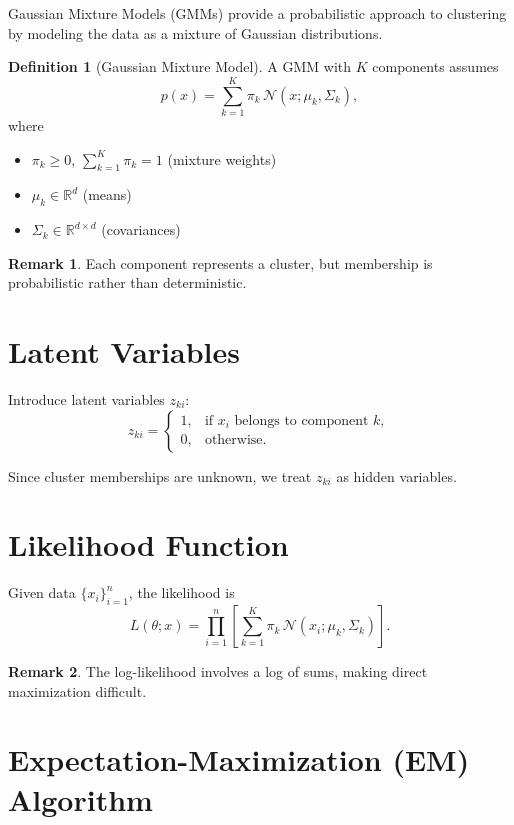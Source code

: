 \documentclass[12pt,oneside]{book}
\numberwithin{equation}{section}
\theoremstyle{definition}
\newtheorem{definition}{Definition}[section]
\newtheorem{remark}{Remark}[section]
\theoremstyle{plain}
\theoremstyle{remark}
\newcommand{\R}{\mathbb{R}}
\begin{document}
Gaussian Mixture Models (GMMs) provide a probabilistic approach to clustering by modeling the data as a mixture of Gaussian distributions.

\begin{definition}[Gaussian Mixture Model]
A GMM with $K$ components assumes
\[
p(x)
=
\sum_{k=1}^K \pi_k \, \mathcal{N}(x;\mu_k,\Sigma_k),
\]
where
\begin{itemize}
    \item $\pi_k \ge 0$, $\sum_{k=1}^K \pi_k = 1$ (mixture weights)
    \item $\mu_k \in \R^d$ (means)
    \item $\Sigma_k \in \R^{d\times d}$ (covariances)
\end{itemize}
\end{definition}

\begin{remark}
Each component represents a cluster, but membership is probabilistic rather than deterministic.
\end{remark}

\section{Latent Variables}

Introduce latent variables $z_{ki}$:
\[
z_{ki} =
\begin{cases}
1, & \text{if } x_i \text{ belongs to component } k,\\
0, & \text{otherwise}.
\end{cases}
\]

Since cluster memberships are unknown, we treat $z_{ki}$ as hidden variables.

\section{Likelihood Function}

Given data $\{x_i\}_{i=1}^n$, the likelihood is
\[
L(\theta; x)
=
\prod_{i=1}^n
\left[
\sum_{k=1}^K \pi_k \, \mathcal{N}(x_i;\mu_k,\Sigma_k)
\right].
\]

\begin{remark}
The log-likelihood involves a log of sums, making direct maximization difficult.
\end{remark}

\section{Expectation-Maximization (EM) Algorithm}
\end{document}
